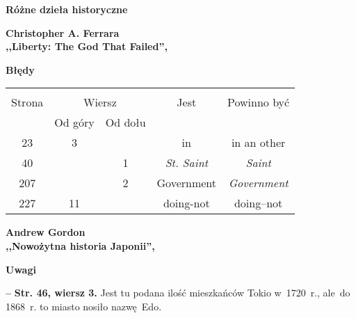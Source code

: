 \documentclass[a4paper,11pt]{article}  %
\newcommand{\spaceTwo}{2em}
\newcommand{\spaceThree}{1em}
\newcommand{\spaceFour}{0.5em}
\newcommand{\tb}{\textbf}
\newcommand{\noi}{\noindent}
\newcommand{\start}{\noi \tb{--} {}}
\newcommand{\StrWg}[2]{\tb{Str. #1, wiersz #2.}}
\newcommand{\Center}[1]{\begin{center} #1 \end{center}}
\newcommand{\CenterTB}[1]{\Center{\tb{#1}}}
\newcommand{\Field}[1]{ \begin{center} {\Large \tb{#1} } \end{center} }
\newcommand{\Work}[1]{ \begin{center} {\large \tb{#1}} \end{center} }
\begin{document}
\vspace{\spaceTwo}





\newpage
\Field{Różne dzieła historyczne}

\vspace{\spaceTwo} \vspace{\spaceThree}



\Work{
  Christopher A. Ferrara \\
  ,,Liberty: The God That Failed'', \cite{Ferrara12} }


\CenterTB{Błędy}

\begin{center}
  \begin{tabular}{|c|c|c|c|c|}
    \hline
    & \multicolumn{2}{c|}{} & & \\
    Strona & \multicolumn{2}{c|}{Wiersz}& Jest & Powinno być \\ \cline{2-3}
    & Od góry & Od dołu &  &  \\ \hline
    23  &  3 & & in & in an other \\
    40  & &  1 & \emph{St. Saint} & \emph{Saint} \\
    207 & &  2 & Government & \emph{Government} \\
    227 & 11 & & doing-not & doing--not \\
    \hline
  \end{tabular}
\end{center}

\vspace{\spaceTwo}





\newpage

\Work{
  Andrew Gordon \\
  ,,Nowożytna historia Japonii'',
  \cite{GordonNowozytnaHistoriaJaponii10} }


\CenterTB{Uwagi}

\start \StrWg{46}{3} Jest tu podana ilość mieszkańców Tokio w~1720~r.,
ale~do 1868~r. to miasto nosiło nazwę~Edo.

\vspace{\spaceFour}
\end{document}
